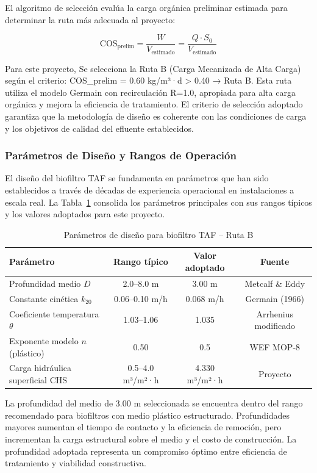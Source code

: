 \documentclass[12pt,a4paper]{article}
\begin{document}
El algoritmo de selección evalúa la carga orgánica preliminar estimada para determinar la ruta más adecuada al proyecto:

\begin{equation}
\text{COS}_{\text{prelim}} = \frac{W}{V_{\text{estimado}}} = \frac{Q \cdot S_0}{V_{\text{estimado}}}
\end{equation}

Para este proyecto, Se selecciona la Ruta B (Carga Mecanizada de Alta Carga) según el criterio: COS_prelim = 0.60 kg/m³·d > 0.40 → Ruta B. Esta ruta utiliza el modelo Germain con recirculación R=1.0, apropiada para alta carga orgánica y mejora la eficiencia de tratamiento. El criterio de selección adoptado garantiza que la metodología de diseño es coherente con las condiciones de carga y los objetivos de calidad del efluente establecidos.

\subsubsection*{Parámetros de Diseño y Rangos de Operación}

El diseño del biofiltro TAF se fundamenta en parámetros que han sido establecidos a través de décadas de experiencia operacional en instalaciones a escala real. La Tabla~\ref{tab:parametros_taf} consolida los parámetros principales con sus rangos típicos y los valores adoptados para este proyecto.

\begin{table}[H]
\centering
\caption{Parámetros de diseño para biofiltro TAF -- Ruta B}
\label{tab:parametros_taf}
\begin{tabular}{p{4cm}ccc}
\toprule
\textbf{Parámetro} & \textbf{Rango típico} & \textbf{Valor adoptado} & \textbf{Fuente} \\
\midrule
Profundidad medio $D$ & 2.0--8.0 m & 3.00 m & Metcalf \& Eddy \\
Constante cinética $k_{20}$ & 0.06--0.10 m/h & 0.068 m/h & Germain (1966) \\
Coeficiente temperatura $\theta$ & 1.03--1.06 & 1.035 & Arrhenius modificado \\
Exponente modelo $n$ (plástico) & 0.50 & 0.5 & WEF MOP-8 \\
Carga hidráulica superficial CHS & 0.5--4.0 m³/m²·h & 4.330 m³/m²·h & Proyecto \\
\bottomrule
\end{tabular}
\end{table}

La profundidad del medio de 3.00 m seleccionada se encuentra dentro del rango recomendado para biofiltros con medio plástico estructurado. Profundidades mayores aumentan el tiempo de contacto y la eficiencia de remoción, pero incrementan la carga estructural sobre el medio y el costo de construcción. La profundidad adoptada representa un compromiso óptimo entre eficiencia de tratamiento y viabilidad constructiva.
\end{document}
